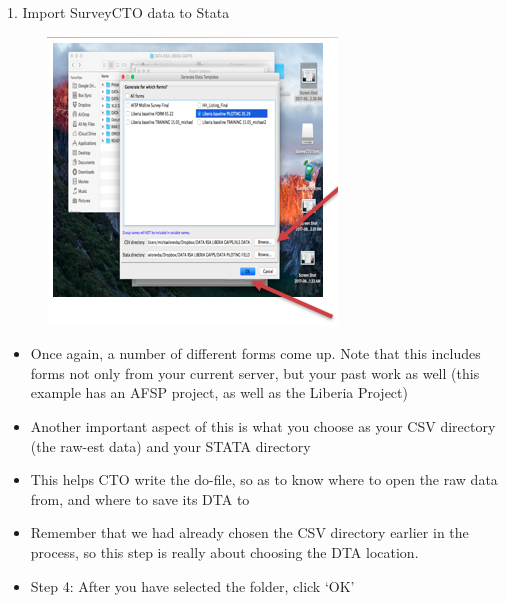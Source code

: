 \documentclass[aspectratio=169]{beamer}
\begin{document}
\begin{frame}[fragile]{1. Import SurveyCTO data to Stata}
\begin{multicols}{2}	
	\begin{figure}
		\centering
		\includegraphics[width=\linewidth]{img/scto4}
	\end{figure}
	\begin{itemize}
		\item Once again, a number of different forms come up. Note that this includes forms not only from your current server, but your past work as well (this example has an AFSP project, as well as the Liberia Project)
		\item Another important aspect of this is what you choose as your CSV directory (the raw-est data) and your STATA directory
		\item This helps CTO write the do-file, so as to know where to open the raw data from, and where to save its DTA to
		\item Remember that we had already chosen the CSV directory earlier in the process, so this step is really about choosing the DTA location.
		\item Step 4: After you have selected the folder, click ‘OK’ 
	\end{itemize}
\end{multicols}
\end{frame}
\end{document}
